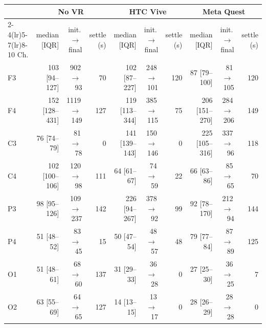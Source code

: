 \begin{tabular}{lrrrrrrrrr}
\toprule
 & \multicolumn{3}{c}{No VR} & \multicolumn{3}{c}{HTC Vive} & \multicolumn{3}{c}{Meta Quest} \\
\cmidrule(lr){2-4}\cmidrule(lr){5-7}\cmidrule(lr){8-10}
Ch. & median [IQR] & init.\,$\to$\,final & settle (s) & median [IQR] & init.\,$\to$\,final & settle (s) & median [IQR] & init.\,$\to$\,final & settle (s) \\
\midrule
F3 & 103 [94--127] & 902\,$\to$\,93 & 70 & 102 [87--227] & 248\,$\to$\,101 & 120 & 87 [79--100] & 81\,$\to$\,105 & 120 \\
F4 & 152 [128--431] & 1119\,$\to$\,149 & 127 & 119 [113--344] & 385\,$\to$\,115 & 75 & 206 [151--270] & 284\,$\to$\,206 & 149 \\
C3 & 76 [74--79] & 81\,$\to$\,78 & 0 & 141 [139--143] & 150\,$\to$\,146 & 0 & 225 [105--316] & 337\,$\to$\,96 & 118 \\
C4 & 102 [100--106] & 120\,$\to$\,98 & 111 & 64 [61--67] & 74\,$\to$\,59 & 22 & 66 [63--86] & 85\,$\to$\,65 & 70 \\
P3 & 98 [95--126] & 109\,$\to$\,237 & 142 & 226 [94--267] & 378\,$\to$\,92 & 99 & 92 [78--170] & 212\,$\to$\,94 & 144 \\
P4 & 51 [48--52] & 83\,$\to$\,45 & 15 & 50 [47--54] & 48\,$\to$\,57 & 48 & 79 [77--84] & 87\,$\to$\,89 & 125 \\
O1 & 51 [48--61] & 68\,$\to$\,60 & 137 & 31 [29--33] & 36\,$\to$\,28 & 0 & 27 [25--30] & 36\,$\to$\,25 & 7 \\
O2 & 63 [55--69] & 64\,$\to$\,65 & 127 & 14 [13--15] & 13\,$\to$\,17 & 0 & 28 [26--29] & 28\,$\to$\,28 & 0 \\
\bottomrule
\end{tabular}
